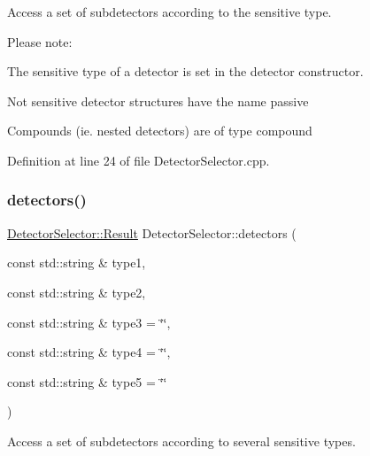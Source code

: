 Access a set of subdetectors according to the sensitive type. 

Please note\+:
\begin{DoxyItemize}
\item The sensitive type of a detector is set in the \textquotesingle{}detector constructor\textquotesingle{}.
\item Not sensitive detector structures have the name \textquotesingle{}passive\textquotesingle{}
\item Compounds (ie. nested detectors) are of type \textquotesingle{}compound\textquotesingle{} 
\end{DoxyItemize}

Definition at line 24 of file Detector\+Selector.\+cpp.

\hypertarget{class_d_d4hep_1_1_geometry_1_1_detector_selector_ab4d3e85afb6df129d15ae55a09ca1c3f}{}\label{class_d_d4hep_1_1_geometry_1_1_detector_selector_ab4d3e85afb6df129d15ae55a09ca1c3f} 
\subsubsection{\texorpdfstring{detectors()}{detectors()}\hspace{0.1cm}{\footnotesize\ttfamily [2/3]}}
{\footnotesize\ttfamily \hyperlink{class_d_d4hep_1_1_geometry_1_1_detector_selector_a6ce0dfe8c83f5d36138244218f260ed1}{Detector\+Selector\+::\+Result} Detector\+Selector\+::detectors (\begin{DoxyParamCaption}\item[{const std\+::string \&}]{type1,  }\item[{const std\+::string \&}]{type2,  }\item[{const std\+::string \&}]{type3 = {\ttfamily \char`\"{}\char`\"{}},  }\item[{const std\+::string \&}]{type4 = {\ttfamily \char`\"{}\char`\"{}},  }\item[{const std\+::string \&}]{type5 = {\ttfamily \char`\"{}\char`\"{}} }\end{DoxyParamCaption})}



Access a set of subdetectors according to several sensitive types. 



